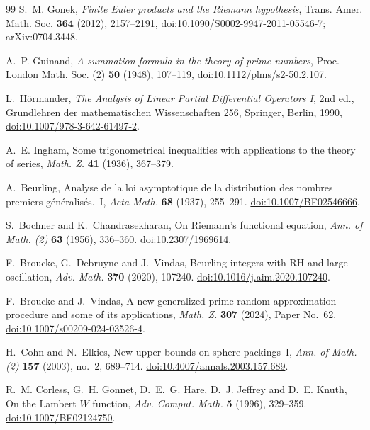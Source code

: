 \documentclass[11pt,reqno]{amsart}
\numberwithin{equation}{section}
\theoremstyle{plain}
\theoremstyle{definition}
\theoremstyle{remark}
\begin{document}
\begin{thebibliography}{99}
S.~M. Gonek, \emph{Finite Euler products and the Riemann hypothesis}, Trans. Amer. Math. Soc. \textbf{364} (2012), 2157--2191, \href{https://doi.org/10.1090/S0002-9947-2011-05546-7}{doi:10.1090/S0002-9947-2011-05546-7}; arXiv:0704.3448.

A.~P. Guinand, \emph{A summation formula in the theory of prime numbers}, Proc. London Math. Soc. (2) \textbf{50} (1948), 107--119, \href{https://doi.org/10.1112/plms/s2-50.2.107}{doi:10.1112/plms/s2-50.2.107}.

L.~H\"ormander, \emph{The Analysis of Linear Partial Differential Operators I}, 2nd ed., Grundlehren der mathematischen Wissenschaften 256, Springer, Berlin, 1990, \href{https://doi.org/10.1007/978-3-642-61497-2}{doi:10.1007/978-3-642-61497-2}.

A.~E. Ingham, Some trigonometrical inequalities with applications to the theory of series, \emph{Math. Z.} \textbf{41} (1936), 367--379.

A.~Beurling, Analyse de la loi asymptotique de la distribution des nombres premiers g\'en\'eralis\'es.~I, \emph{Acta Math.} \textbf{68} (1937), 255--291.
\href{https://doi.org/10.1007/BF02546666}{doi:10.1007/BF02546666}.

S.~Bochner and K.~Chandrasekharan, On Riemann's functional equation, \emph{Ann. of Math. (2)} \textbf{63} (1956), 336--360.
\href{https://doi.org/10.2307/1969614}{doi:10.2307/1969614}.

F.~Broucke, G.~Debruyne and J.~Vindas, Beurling integers with RH and large oscillation, \emph{Adv. Math.} \textbf{370} (2020), 107240.
\href{https://doi.org/10.1016/j.aim.2020.107240}{doi:10.1016/j.aim.2020.107240}.

F.~Broucke and J.~Vindas, A new generalized prime random approximation procedure and some of its applications, \emph{Math. Z.} \textbf{307} (2024), Paper No.~62.
\href{https://doi.org/10.1007/s00209-024-03526-4}{doi:10.1007/s00209-024-03526-4}.

H.~Cohn and N.~Elkies, New upper bounds on sphere packings~I, \emph{Ann. of Math. (2)} \textbf{157} (2003), no.~2, 689--714.
\href{https://doi.org/10.4007/annals.2003.157.689}{doi:10.4007/annals.2003.157.689}.

R.~M. Corless, G.~H. Gonnet, D.~E.~G. Hare, D.~J. Jeffrey and D.~E. Knuth, On the Lambert $W$ function, \emph{Adv. Comput. Math.} \textbf{5} (1996), 329--359.
\href{https://doi.org/10.1007/BF02124750}{doi:10.1007/BF02124750}.


\end{thebibliography}
\end{document}
